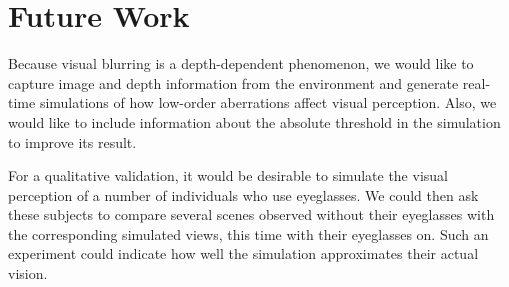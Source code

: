 
\section{Future Work}
\label{sec:ConclusionsFutureWork}

Because visual blurring is a depth-dependent phenomenon, we would like to capture image and depth information from the environment and generate real-time simulations of how low-order aberrations affect visual  perception. Also, 
we would like to include information about the absolute threshold in the simulation to improve its result. 

For a qualitative validation, it would be desirable to simulate the visual perception of a number of individuals who use eyeglasses. We could then ask these subjects to compare several scenes observed without their eyeglasses with the corresponding simulated views, this time with their eyeglasses on. Such an experiment could indicate how well the simulation approximates their actual vision.